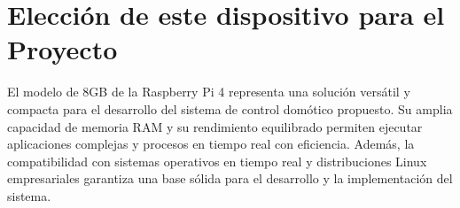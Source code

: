 \section{Elección de este dispositivo para el Proyecto}
    El modelo de 8GB de la Raspberry Pi 4 representa una solución versátil y compacta para el desarrollo del sistema de control domótico propuesto. Su amplia capacidad de memoria RAM y su rendimiento equilibrado permiten ejecutar aplicaciones complejas y procesos en tiempo real con eficiencia. Además, la compatibilidad con sistemas operativos en tiempo real y distribuciones Linux empresariales garantiza una base sólida para el desarrollo y la implementación del sistema.